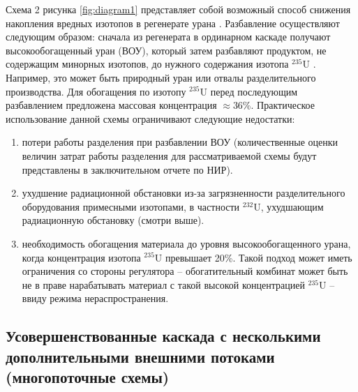Схема 2 рисунка \ref{fig:diagram1} представляет собой возможный способ снижения накопления вредных изотопов в регенерате урана \cite{SposobIzotopnogoVosstanovleniyaa}. Разбавление осуществляют следующим образом: сначала из регенерата в ординарном каскаде получают высокообогащенный уран (ВОУ), который затем разбавляют продуктом, не содержащим минорных изотопов, до нужного содержания изотопа $^{235}$U . Например, это может быть природный уран или отвалы разделительного производства. Для обогащения по изотопу $^{235}$U перед последующим разбавлением предложена массовая концентрация $\approx$36\%. Практическое использование данной схемы ограничивают следующие недостатки: 
\begin{enumerate}
  \item потери работы разделения при разбавлении ВОУ (количественные оценки величин затрат работы разделения для рассматриваемой схемы будут представлены в заключительном отчете по НИР).
  \item ухудшение радиационной обстановки из-за загрязненности разделительного оборудования примесными изотопами, в частности $^{232}$U, ухудшающим радиационную обстановку (смотри выше).
  \item необходимость обогащения материала до уровня высокообогащенного урана, когда концентрация изотопа $^{235}$U превышает 20\%. Такой подход может иметь ограничения со стороны регулятора -- обогатительный комбинат может быть не в праве нарабатывать материал с такой высокой концентрацией $^{235}$U -- ввиду режима нераспространения.
\end{enumerate}

\subsection{Усовершенствованные каскада с несколькими дополнительными внешними потоками (многопоточные схемы)}


